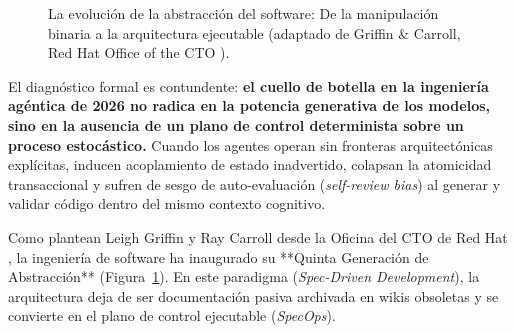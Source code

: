\documentclass[11pt,a4paper]{article}
\begin{document}
\begin{figure}[htbp]
\centering
{}
\caption{La evolución de la abstracción del software: De la manipulación binaria a la arquitectura ejecutable (adaptado de Griffin \& Carroll, Red Hat Office of the CTO \cite{griffin2026spec}).}
\label{fig:abstraction}
\end{figure}

El diagnóstico formal es contundente: \textbf{el cuello de botella en la ingeniería agéntica de 2026 no radica en la potencia generativa de los modelos, sino en la ausencia de un plano de control determinista sobre un proceso estocástico.} Cuando los agentes operan sin fronteras arquitectónicas explícitas, inducen acoplamiento de estado inadvertido, colapsan la atomicidad transaccional y sufren de sesgo de auto-evaluación (\textit{self-review bias}) al generar y validar código dentro del mismo contexto cognitivo.

Como plantean Leigh Griffin y Ray Carroll desde la Oficina del CTO de Red Hat \cite{griffin2026spec}, la ingeniería de software ha inaugurado su **Quinta Generación de Abstracción** (Figura~\ref{fig:abstraction}). En este paradigma (\textit{Spec-Driven Development}), la arquitectura deja de ser documentación pasiva archivada en wikis obsoletas y se convierte en el plano de control ejecutable (\textit{SpecOps}).
\end{document}
